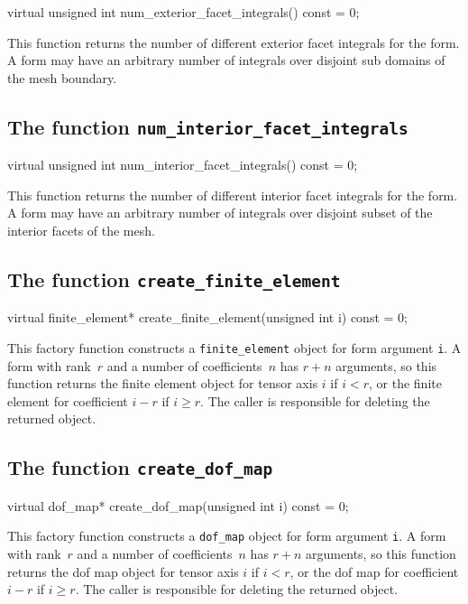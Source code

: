 \begin{code}
virtual unsigned int num_exterior_facet_integrals() const = 0;
\end{code}

This function returns the number of different exterior facet integrals
for the form. A form may have an arbitrary number of integrals over
disjoint sub domains of the mesh boundary.

\subsection{The function \texttt{num\_interior\_facet\_integrals}}

\begin{code}
virtual unsigned int num_interior_facet_integrals() const = 0;
\end{code}

This function returns the number of different interior facet integrals
for the form. A form may have an arbitrary number of integrals over
disjoint subset of the interior facets of the mesh.

\subsection{The function \texttt{create\_finite\_element}}

\begin{code}
virtual finite_element*
create_finite_element(unsigned int i) const = 0;
\end{code}

This factory function constructs a \texttt{finite\_element} object for
form argument \texttt{i}. A form with rank~$r$ and a number of
coefficients~$n$ has $r + n$ arguments, so this function
returns the finite element object for tensor axis $i$ if $i < r$, or
the finite element for coefficient $i - r$ if $i \geq r$.  The caller
is responsible for deleting the returned object.

\subsection{The function \texttt{create\_dof\_map}}

\begin{code}
virtual dof_map*
create_dof_map(unsigned int i) const = 0;
\end{code}

This factory function constructs a \texttt{dof\_map} object for form
argument \texttt{i}. A form with rank~$r$ and a number of
coefficients~$n$ has $r + n$ arguments, so this function
returns the dof map object for tensor axis $i$ if $i < r$, or the dof
map for coefficient $i - r$ if $i \geq r$.  The caller is responsible
for deleting the returned object.

